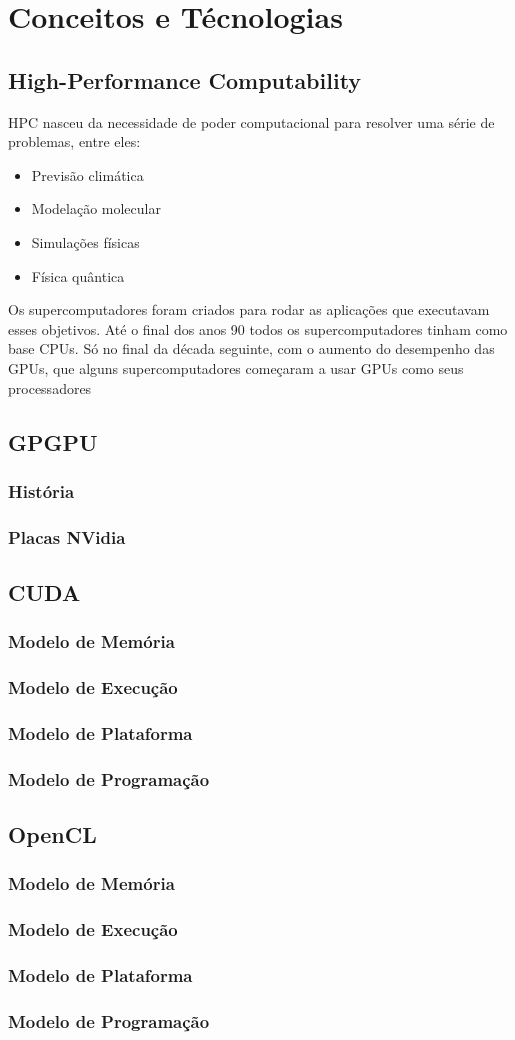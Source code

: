 \section{Conceitos e Técnologias}
\subsection{High-Performance Computability}
HPC nasceu da necessidade de poder computacional para resolver uma série de problemas, entre eles:
\begin{itemize}
  \item Previsão climática
  \item Modelação molecular
  \item Simulações físicas
  \item Física quântica
\end{itemize}
Os supercomputadores foram criados para rodar as aplicações que executavam esses objetivos. Até o final
dos anos 90 todos os supercomputadores tinham como base CPUs. Só no final da década seguinte, com o aumento
do desempenho das GPUs, que alguns supercomputadores começaram a usar GPUs como seus processadores
\subsection{GPGPU}
\subsubsection{História}
\subsubsection{Placas NVidia}
\subsection{CUDA}
\subsubsection{Modelo de Memória}
\subsubsection{Modelo de Execução}
\subsubsection{Modelo de Plataforma}
\subsubsection{Modelo de Programação}
\subsection{OpenCL}
\subsubsection{Modelo de Memória}
\subsubsection{Modelo de Execução}
\subsubsection{Modelo de Plataforma}
\subsubsection{Modelo de Programação}
